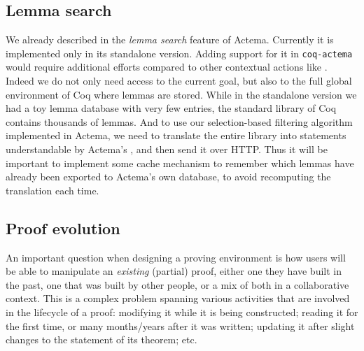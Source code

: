 \subsection{Lemma search}

We already described in  the \emph{lemma search} feature of
Actema. Currently it is implemented only in its standalone version. Adding
support for it in \texttt{coq-actema} would require additional efforts compared
to other contextual actions like . Indeed we do not only need
access to the current goal, but also to the full global environment of Coq where
lemmas are stored. While in the standalone version we had a toy lemma database
with very few entries, the standard library of Coq contains thousands of lemmas.
And to use our selection-based filtering algorithm implemented in Actema, we
need to translate the entire library into statements understandable by Actema's
, and then send it over HTTP. Thus it will be important to
implement some cache mechanism to remember which lemmas have already been
exported to Actema's own database, to avoid recomputing the translation each
time.



\subsection{Proof evolution}

An important question when designing a proving environment is how users will be
able to manipulate an \emph{existing} (partial) proof, either one they have
built in the past, one that was built by other people, or a mix of both in a
collaborative context. This is a complex problem spanning various activities
that are involved in the lifecycle of a proof: modifying it while it is being
constructed; reading it for the first time, or many months/years after it was
written; updating it after slight changes to the statement of its theorem;
etc.

